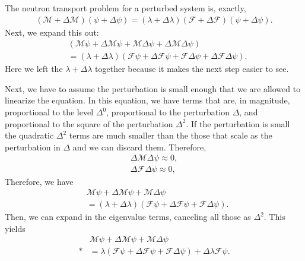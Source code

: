 The neutron transport problem for a perturbed system is, exactly,
\begin{align}
  ( \mathcal{M} + \Delta \mathcal{M} ) ( \psi + \Delta \psi ) = ( \lambda + \Delta \lambda ) ( \mathcal{F} + \Delta \mathcal{F} ) ( \psi + \Delta \psi ) . \label{Eq:kinetics_linearPerturbationDerivation_step0}
\end{align}
Next, we expand this out:
\begin{align}
  &( \mathcal{M} \psi + \Delta \mathcal{M} \psi + \mathcal{M} \Delta \psi + \Delta \mathcal{M} \Delta \psi ) \nonumber \\
  &= ( \lambda + \Delta \lambda ) ( \mathcal{F} \psi + \Delta \mathcal{F} \psi + \mathcal{F} \Delta \psi + \Delta \mathcal{F} \Delta \psi ). \label{Eq:kinetics_linearPerturbationDerivation_step1}
\end{align}
Here we left the $\lambda + \Delta \lambda$ together because it makes the next step easier to see.

Next, we have to assume the perturbation is small enough that we are allowed to linearize the equation. In this equation, we have terms that are, in magnitude, proportional to the level $\Delta^0$, proportional to the perturbation $\Delta$, and proportional to the square of the perturbation $\Delta^2$. If the perturbation is small the quadratic $\Delta^2$ terms are much smaller than the those that scale as the perturbation in $\Delta$ and we can discard them. Therefore,
\begin{subequations}
\begin{align} 
  \Delta \mathcal{M} \Delta \psi \approx 0, \\
  \Delta \mathcal{F} \Delta \psi \approx 0,
\end{align}
\end{subequations}
Therefore, we have
\begin{align}
  &\mathcal{M} \psi + \Delta \mathcal{M} \psi + \mathcal{M} \Delta \psi \nonumber \\
  &= ( \lambda + \Delta \lambda ) ( \mathcal{F} \psi + \Delta \mathcal{F} \psi + \mathcal{F} \Delta \psi ). \label{Eq:kinetics_linearPerturbationDerivation_step2}
\end{align}
Then, we can expand in the eigenvalue terms, canceling all those as $\Delta^2$. This yields
\begin{align}
  &\mathcal{M} \psi + \Delta \mathcal{M} \psi + \mathcal{M} \Delta \psi \nonumber \\*
  &= \lambda ( \mathcal{F} \psi + \Delta \mathcal{F} \psi + \mathcal{F} \Delta \psi ) + \Delta \lambda \mathcal{F} \psi. \label{Eq:kinetics_linearPerturbationDerivation_step3}
\end{align}

